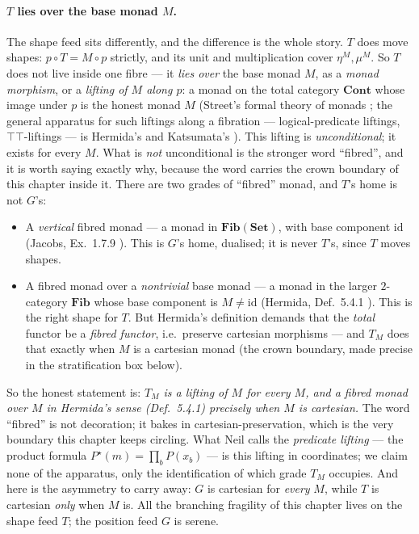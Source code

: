 \documentclass[11pt,a4paper]{book}
\newcommand{\Set}{\mathbf{Set}}
\newcommand{\Cont}{\mathbf{Cont}}
\newcommand{\id}{\mathrm{id}}
\theoremstyle{plain}
\theoremstyle{definition}
\theoremstyle{remark}
\begin{document}
\paragraph{$T$ lies over the base monad $M$.} The shape feed sits differently, and the difference is the
whole story. $T$ does move shapes: $p\circ T=M\circ p$ strictly, and its unit and multiplication cover
$\eta^{M},\mu^{M}$. So $T$ does not live inside one fibre --- it \emph{lies over} the base monad $M$, as a
\emph{monad morphism}, or a \emph{lifting of $M$ along $p$}: a monad on the total category $\Cont$ whose
image under $p$ is the honest monad $M$ (Street's formal theory of monads \cite{Street72}; the general
apparatus for such liftings along a fibration --- logical-predicate liftings, $\top\top$-liftings --- is
Hermida's \cite{Hermida93} and Katsumata's \cite{Katsumata13}). This lifting is \emph{unconditional}; it
exists for every $M$. What is \emph{not} unconditional is the stronger word ``fibred'', and it is worth
saying exactly why, because the word carries the crown boundary of this chapter inside it. There are two
grades of ``fibred'' monad, and $T$'s home is not $G$'s:
\begin{itemize}[nosep]
  \item A \emph{vertical} fibred monad --- a monad in $\mathbf{Fib}(\Set)$, with base component $\id$
        (Jacobs, Ex.~1.7.9 \cite{Jacobs99}). This is $G$'s home, dualised; it is never $T$'s, since $T$
        moves shapes.
  \item A fibred monad over a \emph{nontrivial} base monad --- a monad in the larger $2$-category
        $\mathbf{Fib}$ whose base component is $M\neq\id$ (Hermida, Def.~5.4.1 \cite{Hermida93}). This is
        the right shape for $T$. But Hermida's definition demands that the \emph{total} functor be a
        \emph{fibred functor}, i.e.\ preserve cartesian morphisms --- and $T_{M}$ does that exactly when
        $M$ is a cartesian monad (the crown boundary, made precise in the stratification box below).
\end{itemize}
So the honest statement is: \emph{$T_{M}$ is a lifting of $M$ for every $M$, and a fibred monad over $M$
in Hermida's sense (Def.~5.4.1) precisely when $M$ is cartesian.} The word ``fibred'' is not decoration;
it bakes in cartesian-preservation, which is the very boundary this chapter keeps circling. What Neil calls
the \emph{predicate lifting} --- the product formula $P^{\star}(m)=\prod_{b}P(x_{b})$ --- is this lifting
in coordinates; we claim none of the apparatus, only the identification of which grade $T_{M}$ occupies.
And here is the asymmetry to carry away: $G$ is
cartesian for \emph{every} $M$, while $T$ is cartesian \emph{only} when $M$ is. All the branching fragility
of this chapter lives on the shape feed $T$; the position feed $G$ is serene.
\end{document}
